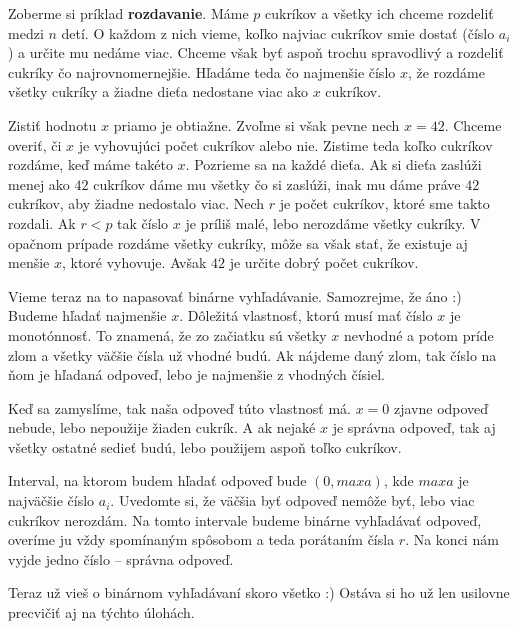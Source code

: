 Zoberme si príklad \textbf{rozdavanie}. Máme $p$ cukríkov a všetky ich chceme rozdeliť medzi $n$
detí. O každom z nich vieme, koľko najviac cukríkov smie dostať (číslo $a_i$) a určite mu nedáme
viac. Chceme však byť aspoň trochu spravodlivý a rozdeliť cukríky čo najrovnomernejšie. Hľadáme teda
čo najmenšie číslo $x$, že rozdáme všetky cukríky a žiadne dieťa nedostane viac ako $x$ cukríkov.

Zistiť hodnotu $x$ priamo je obtiažne. Zvoľme si však pevne nech $x = 42$. Chceme overiť, či $x$ je
vyhovujúci počet cukríkov alebo nie. Zistime teda koľko cukríkov rozdáme, keď máme takéto $x$.
Pozrieme sa na každé dieťa. Ak si dieťa zaslúži menej ako $42$ cukríkov dáme mu všetky čo si
zaslúži, inak mu dáme práve $42$ cukríkov, aby žiadne nedostalo viac. Nech $r$ je počet cukríkov,
ktoré sme takto rozdali. Ak $r < p$ tak číslo $x$ je príliš malé, lebo nerozdáme všetky cukríky. V
opačnom prípade rozdáme všetky cukríky, môže sa však stať, že existuje aj menšie $x$, ktoré
vyhovuje. Avšak $42$ je určite dobrý počet cukríkov.

Vieme teraz na to napasovať binárne vyhľadávanie. Samozrejme, že áno :) Budeme hľadať najmenšie $x$.
Dôležitá vlastnosť, ktorú musí mať číslo $x$ je monotónnosť. To znamená, že zo začiatku sú všetky
$x$ nevhodné a potom príde zlom a všetky väčšie čísla už vhodné budú. Ak nájdeme daný zlom, tak
číslo na ňom je hľadaná odpoveď, lebo je najmenšie z vhodných čísiel.

Keď sa zamyslíme, tak naša odpoveď túto vlastnosť má. $x = 0$ zjavne odpoveď nebude, lebo nepoužije
žiaden cukrík. A ak nejaké $x$ je správna odpoveď, tak aj všetky ostatné sedieť budú, lebo použijem
aspoň toľko cukríkov.

Interval, na ktorom budem hľadať odpoveď bude $(0, maxa)$, kde $maxa$ je najväčšie číslo $a_i$.
Uvedomte si, že väčšia byť odpoveď nemôže byť, lebo viac cukríkov nerozdám. Na tomto intervale
budeme binárne vyhľadávať odpoveď, overíme ju vždy spomínaným spôsobom a teda porátaním čísla $r$.
Na konci nám vyjde jedno číslo -- správna odpoveď.

\medskip

Teraz už vieš o binárnom vyhľadávaní skoro všetko :) Ostáva si ho už len usilovne precvičiť aj na
týchto úlohách.


